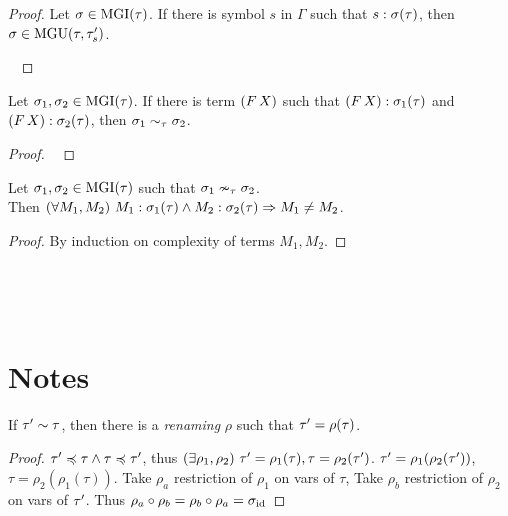 \documentclass[a4paper,oneside]{memoir}
\begin{document}
\begin{proof}
Let $\sigma \in \operatorname{MGI}(\tau)$.
If there is symbol $s$ in $\Gamma$ such that
$s : \sigma(\tau) $, then $\sigma \in \operatorname{MGU}(\tau,\tau^\prime_s)$.  

~

\end{proof}


\begin{lemma}
Let $\sigma_1, \sigma_2 \in \operatorname{MGI}(\tau)$.
If there is term $(F\,X)$ such that
$(F\,X) : \sigma_1(\tau) $ and $(F\,X) : \sigma_2(\tau)$, then
$\sigma_1 \sim_\tau \sigma_2$.  
\end{lemma}
\begin{proof}~


\end{proof}


\begin{conjecture}
Let $\sigma_1, \sigma_2 \in \operatorname{MGI}(\tau)$ such that $\sigma_1 \nsim_\tau \sigma_2$. \\
Then $(\forall M_1,M_2)\  M_1 : \sigma_1(\tau) \wedge M_2 : \sigma_2(\tau) \Rightarrow M_1 \neq M_2$.  
\end{conjecture}
\begin{proof}
By induction on complexity of terms $M_1,M_2$.

\end{proof}



~

~

\section{Notes}

\begin{lemma}
\label{lem:ren1}
If $\tau^\prime \sim \tau$, then there is a \textit{renaming} $\rho$ such that $\tau^\prime = \rho(\tau)$.
\end{lemma}
\begin{proof}
$\tau^\prime \preccurlyeq \tau \wedge \tau \preccurlyeq \tau^\prime$, thus $(\exists \rho_1, \rho_2)\ \tau^\prime = \rho_1(\tau), \tau = \rho_2(\tau^\prime)$.
$\tau^\prime = \rho_1(\rho_2(\tau^\prime))$, $\tau = \rho_2(\rho_1(\tau))$.
Take $\rho_a$ restriction of $\rho_1$ on vars of $\tau$,
Take $\rho_b$ restriction of $\rho_2$ on vars of $\tau^\prime$.
Thus $\rho_a \circ \rho_b = \rho_b \circ \rho_a = \sigma_{\operatorname{id}}$ 
\end{proof}
\end{document}
